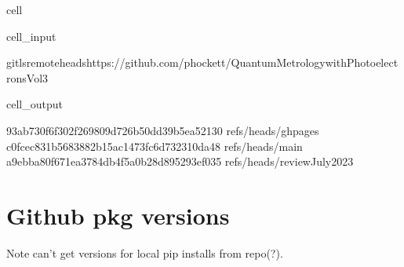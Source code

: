 \documentclass[letterpaper,table,10pt,english]{jupyterBook}
\begin{document}
\begin{sphinxuseclass}{cell}\begin{sphinxVerbatimInput}

\begin{sphinxuseclass}{cell_input}
\begin{sphinxVerbatim}[commandchars=\\\{\}]
gitls\PYGZhy{}remote\PYGZhy{}\PYGZhy{}headshttps://github.com/phockett/Quantum\PYGZhy{}Metrology\PYGZhy{}with\PYGZhy{}Photoelectrons\PYGZhy{}Vol3
\end{sphinxVerbatim}

\end{sphinxuseclass}\end{sphinxVerbatimInput}
\begin{sphinxVerbatimOutput}

\begin{sphinxuseclass}{cell_output}
\begin{sphinxVerbatim}[commandchars=\\\{\}]
93ab730f6f302f269809d726b50dd39b5ea52130	refs/heads/gh\PYGZhy{}pages
c0fcec831b5683882b15ac1473fc6d732310da48	refs/heads/main
a9ebba80f671ea3784db4f5a0b28d895293ef035	refs/heads/reviewJuly2023
\end{sphinxVerbatim}

\end{sphinxuseclass}\end{sphinxVerbatimOutput}

\end{sphinxuseclass}

\section{Github pkg versions}
\label{\detokenize{tests/build_versions_checks:github-pkg-versions}}
\sphinxAtStartPar
Note \sphinxhyphen{} can’t get versions for local pip installs from repo(?).
\end{document}
